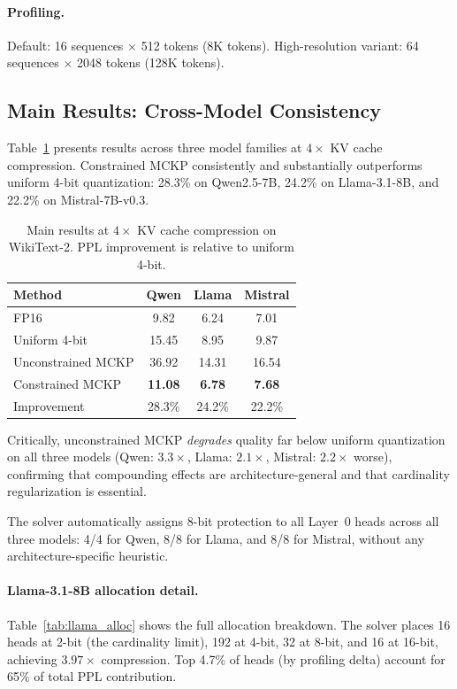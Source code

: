 \documentclass[11pt,a4paper]{article}
\begin{document}
\paragraph{Profiling.} Default: 16 sequences $\times$ 512 tokens (8K tokens).
High-resolution variant: 64 sequences $\times$ 2048 tokens (128K tokens).

\subsection{Main Results: Cross-Model Consistency}
\label{sec:main}

Table~\ref{tab:main} presents results across three model families at $4\times$ KV cache compression.
Constrained MCKP consistently and substantially outperforms uniform 4-bit quantization: 28.3\% on Qwen2.5-7B, 24.2\% on Llama-3.1-8B, and 22.2\% on Mistral-7B-v0.3.

\begin{table}[t]
\centering
\small
\caption{Main results at $4\times$ KV cache compression on WikiText-2. PPL improvement is relative to uniform 4-bit.}
\label{tab:main}
\begin{tabular}{lccc}
\toprule
\textbf{Method} & \textbf{Qwen} & \textbf{Llama} & \textbf{Mistral} \\
\midrule
FP16 & 9.82 & 6.24 & 7.01 \\
Uniform 4-bit & 15.45 & 8.95 & 9.87 \\
Unconstrained MCKP & 36.92 & 14.31 & 16.54 \\
Constrained MCKP & \textbf{11.08} & \textbf{6.78} & \textbf{7.68} \\
\midrule
Improvement & 28.3\% & 24.2\% & 22.2\% \\
\bottomrule
\end{tabular}
\end{table}

Critically, unconstrained MCKP \emph{degrades} quality far below uniform quantization on all three models (Qwen: $3.3\times$, Llama: $2.1\times$, Mistral: $2.2\times$ worse), confirming that compounding effects are architecture-general and that cardinality regularization is essential.

The solver automatically assigns 8-bit protection to all Layer~0 heads across all three models: 4/4 for Qwen, 8/8 for Llama, and 8/8 for Mistral, without any architecture-specific heuristic.

\paragraph{Llama-3.1-8B allocation detail.}
Table~\ref{tab:llama_alloc} shows the full allocation breakdown.
The solver places 16 heads at 2-bit (the cardinality limit), 192 at 4-bit, 32 at 8-bit, and 16 at 16-bit, achieving $3.97\times$ compression.
Top 4.7\% of heads (by profiling delta) account for 65\% of total PPL contribution.
\end{document}
